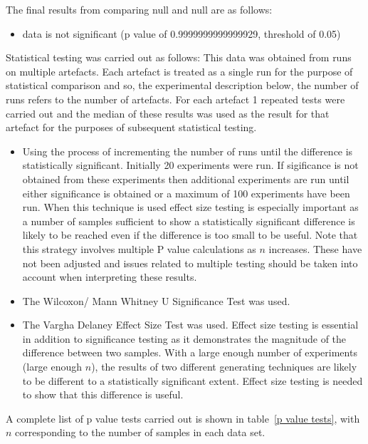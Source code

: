 \documentclass[]{article}
\begin{document}
The final results from comparing null and null are as follows:
\begin{itemize}
\item{data is not significant (p value of 0.9999999999999929, threshold of 0.05)}
\end{itemize}Statistical testing was carried out as follows: 
This data was obtained from runs on multiple artefacts. Each artefact is treated as a single run for the purpose of statistical comparison and so, the experimental description below,  the number of runs refers to the number of artefacts. For each artefact 1 repeated tests were carried out and the median of these results was used as the result for that artefact for the purposes of subsequent statistical testing.\begin{itemize}
\item{Using the process of incrementing the number of runs until the difference is statistically significant. Initially 20 experiments were run. If sigificance is not obtained from these experiments then additional experiments are run until either significance is obtained or a maximum of 100 experiments have been run. When this technique is used effect size testing is especially important as a number of samples sufficient to show a statistically significant difference is likely to be reached even if the difference is too small to be useful. Note that this strategy involves multiple P value calculations as $n$ increases. These have not been adjusted and issues related to multiple testing should be taken into account when interpreting these results.
}
\item{The Wilcoxon/ Mann Whitney U Significance Test was used.}
\item{The Vargha Delaney Effect Size Test was used. Effect size testing is essential in addition to significance testing as it demonstrates the magnitude of the difference between two samples. With a large enough number of experiments (large enough $n$), the results of two different generating techniques are likely to be different to a statistically significant extent. Effect size testing is needed to show that this difference is useful.}
\end{itemize}A complete list of p value tests carried out is shown in table~\ref{p value tests}, with $n$ corresponding to the number of samples in each data set.
\end{document}
